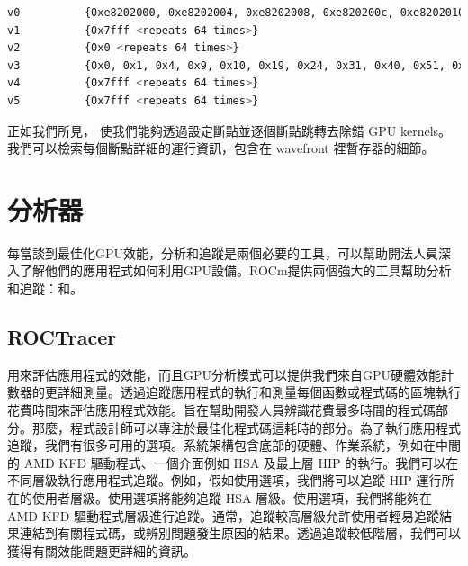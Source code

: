 \begin{lstlisting}[language=bash, caption={info registers的部分輸出}, label={lst:Partial output of info registers command}]
v0          {0xe8202000, 0xe8202004, 0xe8202008, 0xe820200c, 0xe8202010, 0xe8202014, 0xe8202018, 0xe820201c, 0xe8202020, 0xe8202024, 0xe8202028, 0xe820202c, 0xe8202030, 0xe8202034, 0xe8202038, 0xe820203c, 0xe8202040, 0xe8202044, 0xe8202048, 0xe820204c, 0xe8202050, 0xe8202054, 0xe8202058, 0xe820205c, 0xe8202060, 0xe8202064, 0xe8202068, 0xe820206c, 0xe8202070, 0xe8202074, 0xe8202078, 0xe820207c, 0xe8202080, 0xe8202084, 0xe8202088, 0xe820208c, 0xe8202090, 0xe8202094, 0xe8202098, 0xe820209c, 0xe82020a0, 0xe82020a4, 0xe82020a8, 0xe82020ac, 0xe82020b0, 0xe82020b4, 0xe82020b8, 0xe82020bc, 0xe82020c0, 0xe82020c4, 0xe82020c8, 0xe82020cc, 0xe82020d0, 0xe82020d4, 0xe82020d8, 0xe82020dc, 0xe82020e0, 0xe82020e4, 0xe82020e8, 0xe82020ec, 0xe82020f0, 0xe82020f4, 0xe82020f8, 0xe82020fc}
v1          {0x7fff <repeats 64 times>}
v2          {0x0 <repeats 64 times>}
v3          {0x0, 0x1, 0x4, 0x9, 0x10, 0x19, 0x24, 0x31, 0x40, 0x51, 0x64, 0x79, 0x90, 0xa9, 0xc4, 0xe1, 0x100, 0x121, 0x144, 0x169, 0x190, 0x1b9, 0x1e4, 0x211, 0x240, 0x271, 0x2a4, 0x2d9, 0x310, 0x349, 0x384, 0x3c1, 0x400, 0x441, 0x484, 0x4c9, 0x510, 0x559, 0x5a4, 0x5f1, 0x640, 0x691, 0x6e4, 0x739, 0x790, 0x7e9, 0x844, 0x8a1, 0x900, 0x961, 0x9c4, 0xa29, 0xa90, 0xaf9, 0xb64, 0xbd1, 0xc40, 0xcb1, 0xd24, 0xd99, 0xe10, 0xe89, 0xf04, 0xf81}
v4          {0x7fff <repeats 64 times>}
v5          {0x7fff <repeats 64 times>}
\end{lstlisting}

正如我們所見， 使我們能夠透過設定斷點並逐個斷點跳轉去除錯 GPU kernels。我們可以檢索每個斷點詳細的運行資訊，包含在 wavefront 裡暫存器的細節。

\section{ 分析器}

每當談到最佳化GPU效能，分析和追蹤是兩個必要的工具，可以幫助開法人員深入了解他們的應用程式如何利用GPU設備。ROCm提供兩個強大的工具幫助分析和追蹤：和。

\subsection{ROCTracer}

用來評估應用程式的效能，而且GPU分析模式可以提供我們來自GPU硬體效能計數器的更詳細測量。透過追蹤應用程式的執行和測量每個函數或程式碼的區塊執行花費時間來評估應用程式效能。旨在幫助開發人員辨識花費最多時間的程式碼部分。那麼，程式設計師可以專注於最佳化程式碼這耗時的部分。為了執行應用程式追蹤，我們有很多可用的選項。系統架構包含底部的硬體、作業系統，例如在中間的 AMD KFD 驅動程式、一個介面例如 HSA 及最上層 HIP 的執行。我們可以在不同層級執行應用程式追蹤。例如，假如使用選項，我們將可以追蹤 HIP 運行所在的使用者層級。使用選項將能夠追蹤 HSA 層級。使用選項，我們將能夠在AMD KFD 驅動程式層級進行追蹤。通常，追蹤較高層級允許使用者輕易追蹤結果連結到有關程式碼，或辨別問題發生原因的結果。透過追蹤較低階層，我們可以獲得有關效能問題更詳細的資訊。

